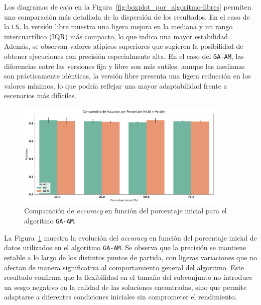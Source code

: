 Los diagramas de caja en la Figura~\ref{fig:boxplot_por_algoritmo-libres} permiten una comparación más detallada de la dispersión de los resultados.
En el caso de la \texttt{LS}, la versión libre muestra una ligera mejora en la mediana y un rango intercuartílico (IQR) más compacto, lo que indica una mayor estabilidad.
Además, se observan valores atípicos superiores que sugieren la posibilidad de obtener ejecuciones con precisión especialmente alta.
En el caso del \texttt{GA-AM}, las diferencias entre las versiones fija y libre son más sutiles: aunque las medianas son prácticamente idénticas,
la versión libre presenta una ligera reducción en los valores mínimos, lo que podría reflejar una mayor adaptabilidad frente a escenarios más difíciles.


\begin{figure}[htp]
    \centering
    \includegraphics[width=0.9\textwidth]{imagenes/evaluaciones/libres/am_por_pi}
    \caption{Comparación de \textit{accuracy} en función del porcentaje inicial para el algoritmo \texttt{GA-AM}.}
    \label{fig:am_por_pi}
\end{figure}

La Figura~\ref{fig:am_por_pi} muestra la evolución del \textit{accuracy} en función del porcentaje inicial de datos utilizados en el algoritmo \texttt{GA-AM}.
Se observa que la precisión se mantiene estable a lo largo de los distintos puntos de partida,
con ligeras variaciones que no afectan de manera significativa al comportamiento general del algoritmo.
Este resultado confirma que la flexibilidad en el tamaño del subconjunto no introduce un sesgo negativo en la calidad de las soluciones encontradas,
sino que permite adaptarse a diferentes condiciones iniciales sin comprometer el rendimiento.


